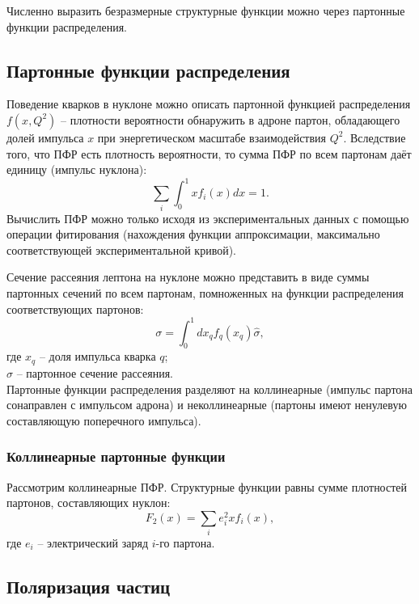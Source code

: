 \documentclass{extarticle}
\begin{document}
Численно выразить безразмерные структурные функции можно через партонные функции распределения.

\subsection{Партонные функции распределения}
Поведение кварков в нуклоне можно описать партонной функцией распределения $f(x,Q^2)$ – плотности вероятности обнаружить в адроне партон, обладающего долей импульса $x$ при энергетическом масштабе взаимодействия $Q^2$. Вследствие того, что ПФР есть плотность вероятности, то сумма ПФР по всем партонам даёт единицу (импульс нуклона):
\begin{equation}
	\sum_i \int_0^1 x f_i(x)dx = 1.
\end{equation}
Вычислить ПФР можно только исходя из экспериментальных данных с помощью операции фитирования (нахождения функции аппроксимации, максимально соответствующей экспериментальной кривой). 

Сечение рассеяния лептона на нуклоне можно представить в виде суммы партонных сечений по всем партонам, помноженных на функции распределения соответствующих партонов:
\begin{equation}
	\sigma = \int_0^1 dx_q f_q(x_q) \hat{\sigma},
\end{equation}
где $x_q$ -- доля импульса кварка $q$; \\ $\hat{\sigma}$ -- партонное сечение рассеяния.\\
Партонные функции распределения разделяют на коллинеарные (импульс партона сонаправлен с импульсом адрона) и неколлинеарные (партоны имеют ненулевую составляющую поперечного импульса).
\subsubsection{Коллинеарные партонные функции}
Рассмотрим коллинеарные ПФР. Структурные функции равны сумме плотностей партонов, составляющих нуклон:
\begin{equation}
F_2(x) = \sum_i e^2_i x f_i(x),
\end{equation}
где $e_i$ -- электрический заряд $i$-го партона.



\newpage
\subsection{Поляризация частиц}
\end{document}
